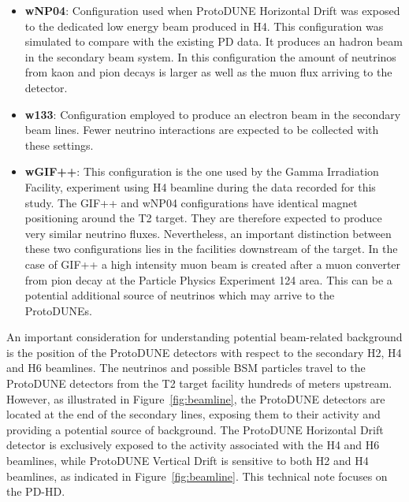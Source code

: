 \begin{itemize}
    \item \textbf{wNP04}: Configuration used when ProtoDUNE Horizontal Drift was exposed to the dedicated low energy beam produced in H4. This configuration was simulated to compare with the existing PD data. It produces an hadron beam in the secondary beam system. In this configuration the amount of neutrinos from kaon and pion decays is larger as well as the muon flux arriving to the detector.  
    \item \textbf{w133}: Configuration employed to produce an electron beam in the secondary beam lines. Fewer neutrino interactions are expected to be collected with these settings. 
    \item \textbf{wGIF++}: This configuration is the one used by the Gamma Irradiation Facility, experiment using H4 beamline during the data recorded for this study. The GIF++ and wNP04 configurations have identical magnet positioning around the T2 target. They are therefore expected to produce very similar neutrino fluxes. Nevertheless, an important distinction between these two configurations lies in the facilities downstream of the target. In the case of GIF++ a high intensity muon beam is created after a muon converter from pion decay at the Particle Physics Experiment 124 area. This can be a potential additional source of neutrinos which may arrive to the ProtoDUNEs.
\end{itemize}

An important consideration for understanding potential beam-related background is the position of the ProtoDUNE detectors with respect to the secondary H2, H4 and H6 beamlines. The neutrinos and possible BSM particles travel to the ProtoDUNE detectors from the T2 target facility hundreds of meters upstream. However, as illustrated in Figure~\ref{fig:beamline}, the ProtoDUNE detectors are located at the end of the secondary lines, exposing them to their activity and providing a potential source of background. The ProtoDUNE Horizontal Drift detector is exclusively exposed to the activity associated with the H4 and H6 beamlines, while ProtoDUNE Vertical Drift is sensitive to both H2 and H4 beamlines, as indicated in Figure~\ref{fig:beamline}. This technical note focuses on the PD-HD.

